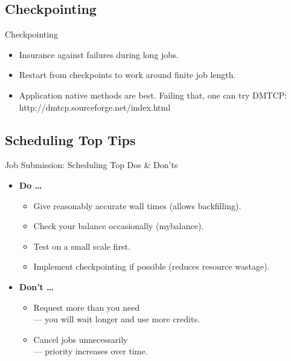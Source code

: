 \subsection{Checkpointing}
\begin{frame}{Checkpointing}
  \begin{itemize}
  \item{Insurance against failures during long jobs.}
  \item{Restart from checkpoints to work around finite job length.}
    \pause
  \item{Application native methods are best. Failing that, one can try \alert{DMTCP}:\hfill\break
  \null\qquad \alert{http://dmtcp.sourceforge.net/index.html}}
  \end{itemize}
\end{frame}

\subsection{Scheduling Top Tips}
\begin{frame}{Job Submission: Scheduling Top Dos \& Don'ts}
\begin{itemize}
\item{\textbf{Do \ldots}}
\begin{itemize}
\item{Give reasonably accurate wall times (allows \alert{backfilling}).}
\item{Check your balance occasionally (\alert{mybalance}).}
\item{Test on a small scale first.}
\item{Implement \alert{checkpointing} if possible (reduces resource wastage).}
\end{itemize}
\medskip
\item{\textbf{Don't \ldots}}
\begin{itemize}
\item{Request more than you need\hfill\\
\qquad --- you will wait longer and use more credits.}
\item{Cancel jobs unnecessarily\hfill\\
\qquad ---  priority increases over time.}
\end{itemize}
\end{itemize}
\end{frame}

